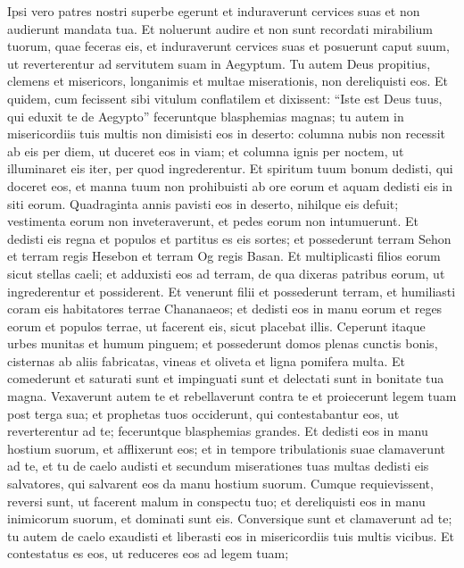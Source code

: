 \begin{biblechapter}
\begin{biblechapter}
\begin{biblechapter}
\begin{biblechapter}
\begin{biblechapter}
\begin{biblechapter}
\begin{biblechapter}
\begin{biblechapter}
\begin{biblechapter}
 \verse Ipsi vero patres nostri superbe egerunt
 et induraverunt cervices suas et non audierunt mandata tua.
 \verse Et noluerunt audire
 et non sunt recordati mirabilium tuorum, quae feceras eis,
 et induraverunt cervices suas
 et posuerunt caput suum,
 ut reverterentur ad servitutem suam in Aegyptum.
 Tu autem Deus propitius, clemens et misericors,
 longanimis et multae miserationis, non dereliquisti eos.
 \verse Et quidem, cum fecissent sibi vitulum conflatilem
 et dixissent: “Iste est Deus tuus,
 qui eduxit te de Aegypto”
 feceruntque blasphemias magnas;
 \verse tu autem in misericordiis tuis multis
 non dimisisti eos in deserto:
 columna nubis non recessit ab eis per diem,
 ut duceret eos in viam;
 et columna ignis per noctem,
 ut illuminaret eis iter, per quod ingrederentur.
 \verse Et spiritum tuum bonum dedisti, qui doceret eos,
 et manna tuum non prohibuisti ab ore eorum
 et aquam dedisti eis in siti eorum.
 \verse Quadraginta annis pavisti eos in deserto,
 nihilque eis defuit;
 vestimenta eorum non inveteraverunt,
 et pedes eorum non intumuerunt.
 \verse Et dedisti eis regna et populos
 et partitus es eis sortes;
 et possederunt terram Sehon et terram regis Hesebon
 et terram Og regis Basan.
 \verse Et multiplicasti filios eorum sicut stellas caeli;
 et adduxisti eos ad terram, de qua dixeras patribus eorum,
 ut ingrederentur et possiderent.
 \verse Et venerunt filii et possederunt terram,
 et humiliasti coram eis habitatores terrae Chananaeos;
 et dedisti eos in manu eorum
 et reges eorum et populos terrae,
 ut facerent eis, sicut placebat illis.
 \verse Ceperunt itaque urbes munitas et humum pinguem;
 et possederunt domos plenas cunctis bonis,
 cisternas ab aliis fabricatas, vineas et oliveta
 et ligna pomifera multa.
 Et comederunt et saturati sunt et impinguati sunt
 et delectati sunt in bonitate tua magna.
 \verse Vexaverunt autem te et rebellaverunt contra te
 et proiecerunt legem tuam post terga sua;
 et prophetas tuos occiderunt,
 qui contestabantur eos, ut reverterentur ad te;
 feceruntque blasphemias grandes.
 \verse Et dedisti eos in manu hostium suorum,
 et afflixerunt eos;
 et in tempore tribulationis suae clamaverunt ad te,
 et tu de caelo audisti
 et secundum miserationes tuas multas dedisti eis salvatores,
 qui salvarent eos da manu hostium suorum.
 \verse Cumque requievissent, reversi sunt,
 ut facerent malum in conspectu tuo;
 et dereliquisti eos in manu inimicorum suorum,
 et dominati sunt eis.
 Conversique sunt et clamaverunt ad te;
 tu autem de caelo exaudisti
 et liberasti eos in misericordiis tuis multis vicibus.
 \verse Et contestatus es eos, ut reduceres eos ad legem tuam;

\end{biblechapter}
\end{biblechapter}
\end{biblechapter}
\end{biblechapter}
\end{biblechapter}
\end{biblechapter}
\end{biblechapter}
\end{biblechapter}
\end{biblechapter}
